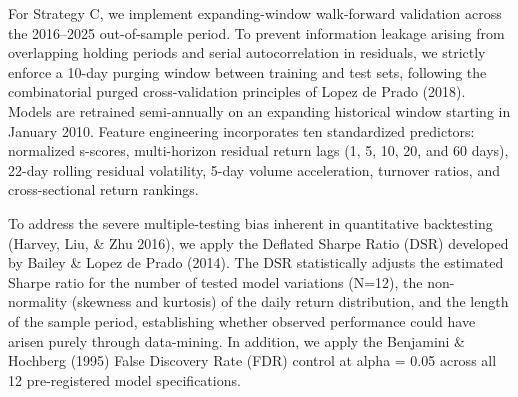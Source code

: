 For Strategy C, we implement expanding-window walk-forward validation across the 2016–2025 out-of-sample period. To prevent information leakage arising from overlapping holding periods and serial autocorrelation in residuals, we strictly enforce a 10-day purging window between training and test sets, following the combinatorial purged cross-validation principles of Lopez de Prado (2018). Models are retrained semi-annually on an expanding historical window starting in January 2010. Feature engineering incorporates ten standardized predictors: normalized s-scores, multi-horizon residual return lags (1, 5, 10, 20, and 60 days), 22-day rolling residual volatility, 5-day volume acceleration, turnover ratios, and cross-sectional return rankings.

To address the severe multiple-testing bias inherent in quantitative backtesting (Harvey, Liu, \& Zhu 2016), we apply the Deflated Sharpe Ratio (DSR) developed by Bailey \& Lopez de Prado (2014). The DSR statistically adjusts the estimated Sharpe ratio for the number of tested model variations (N=12), the non-normality (skewness and kurtosis) of the daily return distribution, and the length of the sample period, establishing whether observed performance could have arisen purely through data-mining. In addition, we apply the Benjamini \& Hochberg (1995) False Discovery Rate (FDR) control at alpha = 0.05 across all 12 pre-registered model specifications.

